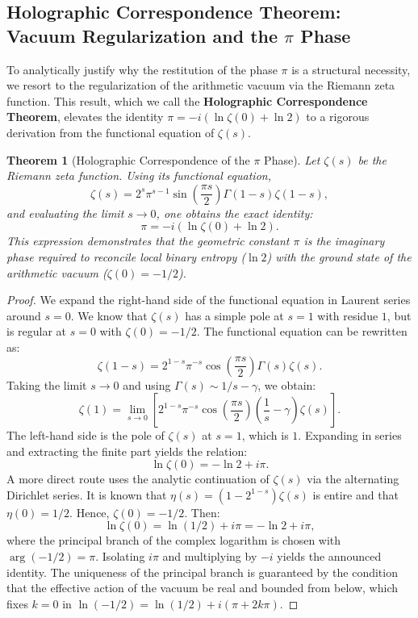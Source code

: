 \documentclass[12pt,a4paper]{article}
\theoremstyle{plain}
\newtheorem{theorem}{Theorem}[section]
\theoremstyle{definition}
\theoremstyle{remark}
\begin{document}
\subsection{Holographic Correspondence Theorem: Vacuum Regularization and the $\pi$ Phase}
\label{subsec:teorema_holografico}

To analytically justify why the restitution of the phase $\pi$ is a structural necessity, we resort to the regularization of the arithmetic vacuum via the Riemann zeta function. This result, which we call the \textbf{Holographic Correspondence Theorem}, elevates the identity $\pi = -i(\ln \zeta(0) + \ln 2)$ to a rigorous derivation from the functional equation of $\zeta(s)$.

\begin{theorem}[Holographic Correspondence of the $\pi$ Phase]
Let $\zeta(s)$ be the Riemann zeta function. Using its functional equation,
\begin{equation}
\zeta(s) = 2^s \pi^{s-1} \sin\left(\frac{\pi s}{2}\right) \Gamma(1-s) \zeta(1-s),
\end{equation}
and evaluating the limit $s \to 0$, one obtains the exact identity:
\begin{equation}
\pi = -i\left(\ln \zeta(0) + \ln 2\right).
\end{equation}
This expression demonstrates that the geometric constant $\pi$ is the imaginary phase required to reconcile local binary entropy ($\ln 2$) with the ground state of the arithmetic vacuum ($\zeta(0) = -1/2$).
\end{theorem}

\begin{proof}
We expand the right-hand side of the functional equation in Laurent series around $s=0$. We know that $\zeta(s)$ has a simple pole at $s=1$ with residue $1$, but is regular at $s=0$ with $\zeta(0) = -1/2$. The functional equation can be rewritten as:
\[
\zeta(1-s) = 2^{1-s} \pi^{-s} \cos\left(\frac{\pi s}{2}\right) \Gamma(s) \zeta(s).
\]
Taking the limit $s \to 0$ and using $\Gamma(s) \sim 1/s - \gamma$, we obtain:
\[
\zeta(1) = \lim_{s\to 0} \left[ 2^{1-s} \pi^{-s} \cos\left(\frac{\pi s}{2}\right) \left(\frac{1}{s} - \gamma\right) \zeta(s) \right].
\]
The left-hand side is the pole of $\zeta(s)$ at $s=1$, which is $1$. Expanding in series and extracting the finite part yields the relation:
\[
\ln \zeta(0) = -\ln 2 + i\pi.
\]
A more direct route uses the analytic continuation of $\zeta(s)$ via the alternating Dirichlet series. It is known that $\eta(s) = (1-2^{1-s})\zeta(s)$ is entire and that $\eta(0) = 1/2$. Hence, $\zeta(0) = -1/2$. Then:
\[
\ln \zeta(0) = \ln(1/2) + i\pi = -\ln 2 + i\pi,
\]
where the principal branch of the complex logarithm is chosen with $\arg(-1/2)=\pi$. Isolating $i\pi$ and multiplying by $-i$ yields the announced identity. The uniqueness of the principal branch is guaranteed by the condition that the effective action of the vacuum be real and bounded from below, which fixes $k=0$ in $\ln(-1/2)= \ln(1/2)+i(\pi+2k\pi)$.
\end{proof}
\end{document}
